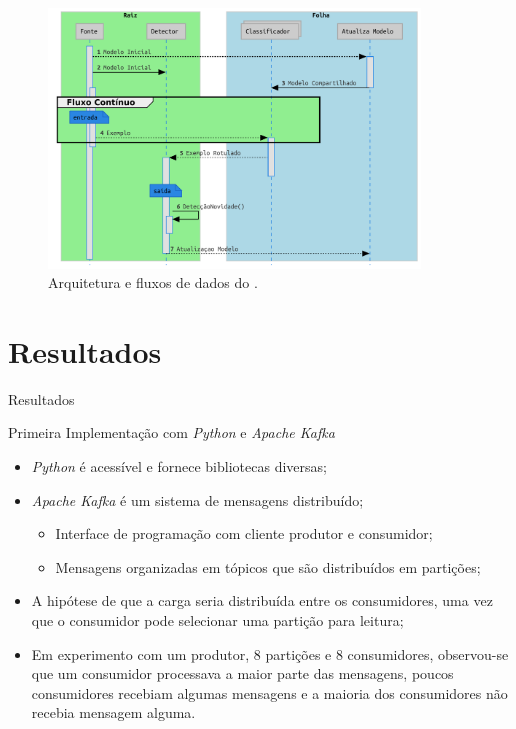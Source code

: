 \documentclass[aspectratio=1610,10pt]{beamer}
\newcommand{\nota}[1]{\hspace*{-0.5cm}\textit{{\color[rgb]{1,0,0}Nota: #1}}}
\begin{document}
\begin{frame}
  \begin{figure}[h]
    \centering
    \includegraphics[width=0.88\textwidth,page=1]{figures/lifecycle-uml-svg.pdf}
    \caption{Arquitetura e fluxos de dados do \mfog.}
    \label{fig:arch}
  \end{figure}
\end{frame}

\section{Resultados}
\begin{frame}[fragile]{Resultados}

  \begin{alertblock}{Primeira Implementação com \emph{Python} e \emph{Apache Kafka}}
    \begin{itemize}%
      \item \emph{Python} é acessível e fornece bibliotecas diversas;
      \item \emph{Apache Kafka} é um sistema de mensagens distribuído;
      \begin{itemize}
        \item Interface de programação com cliente produtor e consumidor;
        \item Mensagens organizadas em tópicos que são distribuídos em partições;
      \end{itemize}
      \item A hipótese de que a carga seria distribuída entre os consumidores,
      uma vez que o consumidor pode selecionar uma partição para leitura;
      \item Em experimento com um produtor, 8 partições e 8 consumidores,
      observou-se que um consumidor processava a maior parte das mensagens,
      poucos consumidores recebiam algumas mensagens e a maioria dos consumidores
      não recebia mensagem alguma.
    \end{itemize}
  \end{alertblock}
\end{frame}
\end{document}
